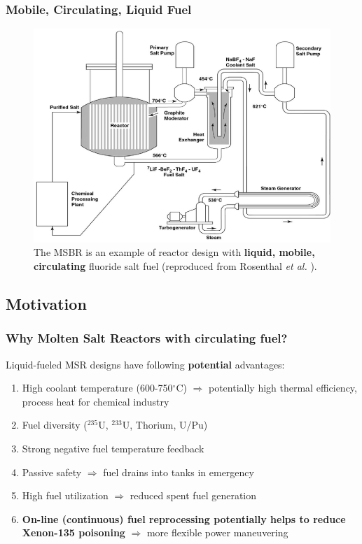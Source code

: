 \begin{frame} %
\frametitle{Mobile, Circulating, Liquid Fuel}
\vspace{-2mm}
\begin{figure}[t]
      \includegraphics[height=0.6\textwidth]{./images/msbr_scheme.png}
	\caption{The \gls{MSBR} is an example of reactor design with 
	\textbf{liquid, mobile, circulating} fluoride salt fuel 
	(reproduced from Rosenthal \emph{et al.} 
	\cite{rosenthal_molten-salt_1970}).}
\end{figure}   

\end{frame}


\subsection{Motivation}

\begin{frame}
\frametitle{Why Molten Salt Reactors with circulating fuel?}
\begin{block}{Liquid-fueled \gls{MSR} designs have following \textbf{potential} advantages:}
	\begin{enumerate}
		\itemsep1em
		\item High coolant temperature (600-750$^{\circ}$C) 
		$\Rightarrow$ potentially high thermal efficiency, process 
		heat for chemical industry
		\item Fuel diversity ($^{235}$U, $^{233}$U, Thorium, U/Pu)
		\item Strong negative fuel temperature feedback 
		\item Passive safety $\Rightarrow$ fuel drains into tanks 
		in emergency
		\item High fuel utilization $\Rightarrow$ reduced spent fuel 
		generation
		\item<2> \textbf{On-line (continuous) fuel reprocessing potentially  
		helps to reduce Xenon-135 poisoning} $\Rightarrow$ more flexible  
		power maneuvering
	\end{enumerate}
\end{block}

\end{frame}


